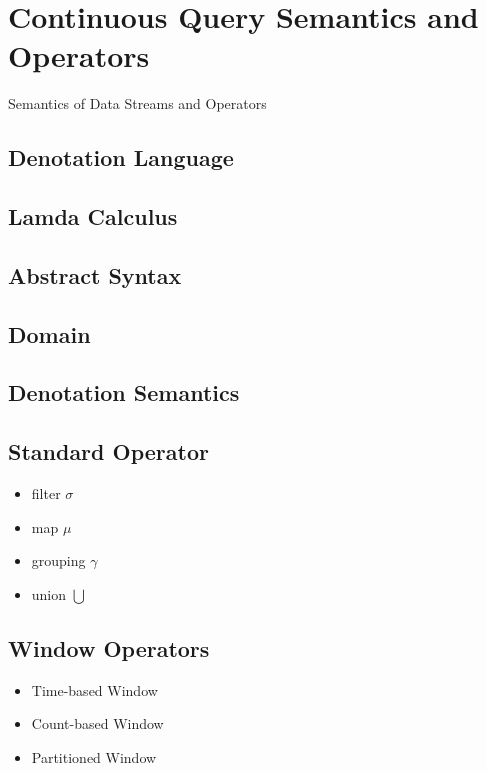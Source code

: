 \section{Continuous Query Semantics and Operators}
Semantics of Data Streams and Operators
\subsection*{Denotation Language}
\subsection*{Lamda Calculus}

\subsection{Abstract Syntax}


\subsection{Domain}

\subsection{Denotation Semantics}








\subsection{Standard Operator}
\begin{itemize}
	\item filter $\sigma$
	\item map $\mu$
	\item grouping $\gamma$  
	\item union $\bigcup$
\end{itemize}

\subsection{Window Operators}
\begin{itemize}
\item Time-based Window
\item Count-based Window
\item Partitioned Window
\end{itemize}



